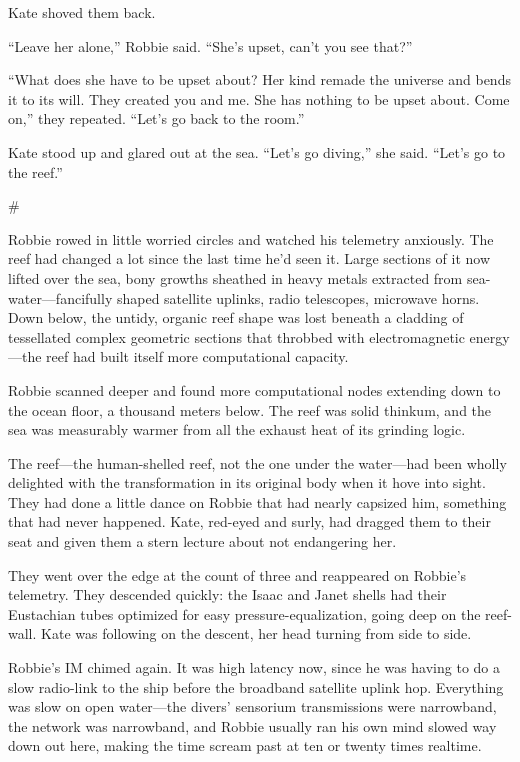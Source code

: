 Kate shoved them back.

“Leave her alone,” Robbie said. “She’s upset, can’t you see that?”

“What does she have to be upset about? Her kind remade the universe
and bends it to its will. They created you and me. She has nothing
to be upset about. Come on,” they repeated. “Let’s go back to the
room.”

Kate stood up and glared out at the sea. “Let’s go diving,” she
said. “Let’s go to the reef.”

\#

Robbie rowed in little worried circles and watched his telemetry
anxiously. The reef had changed a lot since the last time he’d seen
it. Large sections of it now lifted over the sea, bony growths
sheathed in heavy metals extracted from sea-water—fancifully shaped
satellite uplinks, radio telescopes, microwave horns. Down below,
the untidy, organic reef shape was lost beneath a cladding of
tessellated complex geometric sections that throbbed with
electromagnetic energy—the reef had built itself more computational
capacity.

Robbie scanned deeper and found more computational nodes extending
down to the ocean floor, a thousand meters below. The reef was
solid thinkum, and the sea was measurably warmer from all the
exhaust heat of its grinding logic.

The reef—the human-shelled reef, not the one under the water—had
been wholly delighted with the transformation in its original body
when it hove into sight. They had done a little dance on Robbie
that had nearly capsized him, something that had never happened.
Kate, red-eyed and surly, had dragged them to their seat and given
them a stern lecture about not endangering her.

They went over the edge at the count of three and reappeared on
Robbie’s telemetry. They descended quickly: the Isaac and Janet
shells had their Eustachian tubes optimized for easy
pressure-equalization, going deep on the reef-wall. Kate was
following on the descent, her head turning from side to side.

Robbie’s IM chimed again. It was high latency now, since he was
having to do a slow radio-link to the ship before the broadband
satellite uplink hop. Everything was slow on open water—the divers’
sensorium transmissions were narrowband, the network was
narrowband, and Robbie usually ran his own mind slowed way down out
here, making the time scream past at ten or twenty times realtime.

